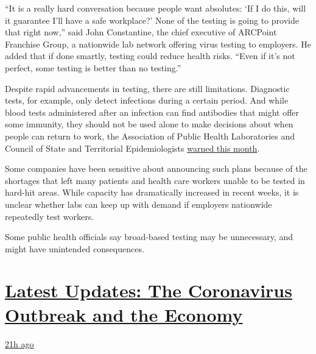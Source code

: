 ``It is a really hard conversation because people want absolutes: `If I
do this, will it guarantee I'll have a safe workplace?' None of the
testing is going to provide that right now,'' said John Constantine, the
chief executive of ARCPoint Franchise Group, a nationwide lab network
offering virus testing to employers. He added that if done smartly,
testing could reduce health risks. ``Even if it's not perfect, some
testing is better than no testing.''

Despite rapid advancements in testing, there are still limitations.
Diagnostic tests, for example, only detect infections during a certain
period. And while blood tests administered after an infection can find
antibodies that might offer some immunity, they should not be used alone
to make decisions about when people can return to work, the Association
of Public Health Laboratories and Council of State and Territorial
Epidemiologists
\href{https://www.aphlblog.org/antibody-testing-important-covid-19-response-data-needed-expand-role/}{warned
this month}.

Some companies have been sensitive about announcing such plans because
of the shortages that left many patients and health care workers unable
to be tested in hard-hit areas. While capacity has dramatically
increased in recent weeks, it is unclear whether labs can keep up with
demand if employers nationwide repeatedly test workers.

Some public health officials say broad-based testing may be unnecessary,
and might have unintended consequences.

\hypertarget{latest-updates-the-coronavirus-outbreak-and-the-economy}{%
\section{\texorpdfstring{\href{https://www.nytimes3xbfgragh.onion/live/2020/08/20/business/stock-market-today-coronavirus?action=click\&pgtype=Article\&state=default\&region=MAIN_CONTENT_1\&context=storylines_live_updates}{Latest
Updates: The Coronavirus Outbreak and the
Economy}}{Latest Updates: The Coronavirus Outbreak and the Economy}}\label{latest-updates-the-coronavirus-outbreak-and-the-economy}}

\href{https://www.nytimes3xbfgragh.onion/live/2020/08/20/business/stock-market-today-coronavirus?action=click\&pgtype=Article\&state=default\&region=MAIN_CONTENT_1\&context=storylines_live_updates\#american-airlines-to-stop-flights-to-15-cities-after-government-aid-ends}{21h
ago}

